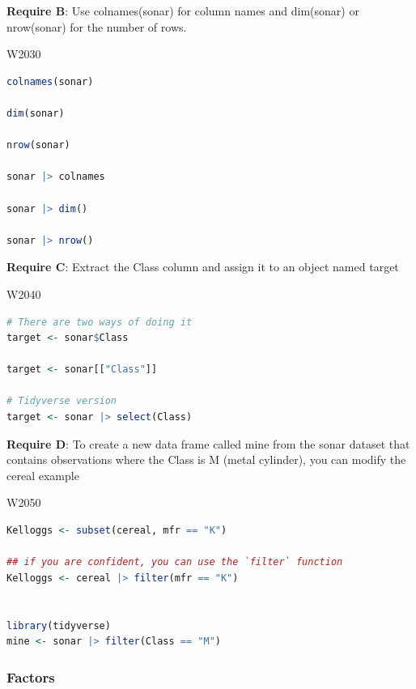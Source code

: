 \noindent\textbf{Require B}: Use colnames(sonar) for column names and dim(sonar) or nrow(sonar) for the number of rows.


\begin{ocg}{}{W203}{0}
\begin{lstlisting}[language = R]
colnames(sonar)

dim(sonar)

nrow(sonar)

sonar |> colnames

sonar |> dim()

sonar |> nrow()
\end{lstlisting}
\end{ocg}

\noindent\textbf{Require C}: Extract the Class column and assign it to an object named target


\begin{ocg}{}{W204}{0}
\begin{lstlisting}[language = R]
# There are two ways of doing it
target <- sonar$Class

target <- sonar[["Class"]]

# Tidyverse version 
target <- sonar |> select(Class)
\end{lstlisting}
\end{ocg}

\noindent\textbf{Require D}: To create a new data frame called mine from the sonar dataset that contains observations where the Class is M (metal cylinder), you can modify the cereal example


\begin{ocg}{}{W205}{0}
\begin{lstlisting}[language = R]
Kelloggs <- subset(cereal, mfr == "K") 

## if you are confident, you can use the `filter` function 
Kelloggs <- cereal |> filter(mfr == "K") 


library(tidyverse)
mine <- sonar |> filter(Class == "M") 
\end{lstlisting}
\end{ocg}

\subsubsection{Factors}

